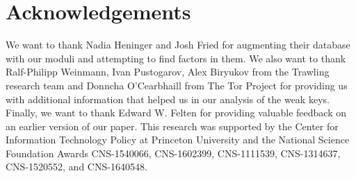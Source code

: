 \section*{Acknowledgements}
We want to thank Nadia Heninger and Josh Fried for augmenting their database
with our moduli and attempting to find factors in them. We also want to
thank Ralf-Philipp Weinmann, Ivan Pustogarov, Alex Biryukov from the Trawling
research team and Donncha O'Cearbhaill from The Tor Project for providing us
with additional information that helped us in our analysis of the weak keys.
Finally, we want to thank Edward W. Felten for providing valuable feedback on
an earlier version of our paper.  This research was supported by the Center for
Information Technology Policy at Princeton University and the National Science
Foundation Awards CNS-1540066, CNS-1602399, CNS-1111539, CNS-1314637,
CNS-1520552, and CNS-1640548.

